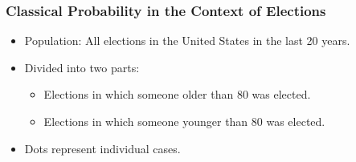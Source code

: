 \documentclass[handout]{beamer} %
\begin{document}
\begin{frame}
\frametitle{Classical Probability in the Context of Elections}

\begin{itemize}
    \item Population: All elections in the United States in the last 20 years. \pause
    \item Divided into two parts:
    \begin{itemize}
        \item Elections in which someone older than 80 was elected. \pause
        \item Elections in which someone younger than 80 was elected. \pause
    \end{itemize}
    \item Dots represent individual cases.
\end{itemize}

\begin{center}
\end{center}
\pause
\end{frame}
\end{document}
